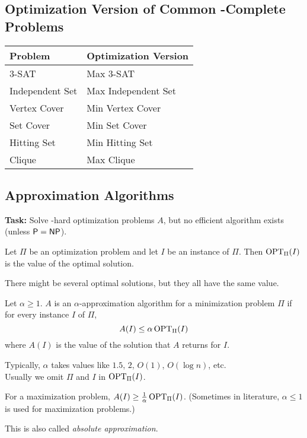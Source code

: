 \subsection{Optimization Version of Common \NP-Complete Problems} \label{sec:optimization_np}
\begin{center}
    \begin{tabular}{ll}
        \toprule
        Problem & Optimization Version \\
        \midrule
        3-SAT & Max 3-SAT \\
        Independent Set & Max Independent Set \\
        Vertex Cover & Min Vertex Cover \\
        Set Cover & Min Set Cover \\
        Hitting Set & Min Hitting Set \\
        Clique & Max Clique \\
        \bottomrule
    \end{tabular}
\end{center}

\subsection{Approximation Algorithms} \label{sec:approx}
\textbf{Task:} Solve \NP-hard optimization problems $A$, but no efficient
algorithm exists (unless $\mathsf{P} = \mathsf{NP}$).
\begin{definition}
    Let $\Pi$ be an optimization problem and let $I$ be an instance of $\Pi$.
    Then $\operatorname{OPT}_\Pi(I)$ is the value of the optimal solution.
\end{definition}
There might be several optimal solutions, but they all have the same value.
\begin{definition}
    Let $\alpha \ge 1$.
    $A$ is an $\alpha$-approximation algorithm for a minimization problem $\Pi$
    if for every instance $I$ of $\Pi$, \[
        A(I) \le \alpha \operatorname{OPT}_\Pi(I)
    \] where $A(I)$ is the value of the solution that $A$ returns for $I$.
\end{definition}
Typically, $\alpha$ takes values like $1.5$, $2$, $O(1)$, $O(\log n)$, etc. \\
Usually we omit $\Pi$ and $I$ in $\operatorname{OPT}_\Pi(I)$.

For a maximization problem, $A(I) \ge \frac1\alpha \operatorname{OPT}_\Pi(I)$.
(Sometimes in literature, $\alpha \le 1$ is used for maximization problems.)

This is also called \emph{absolute approximation}.


